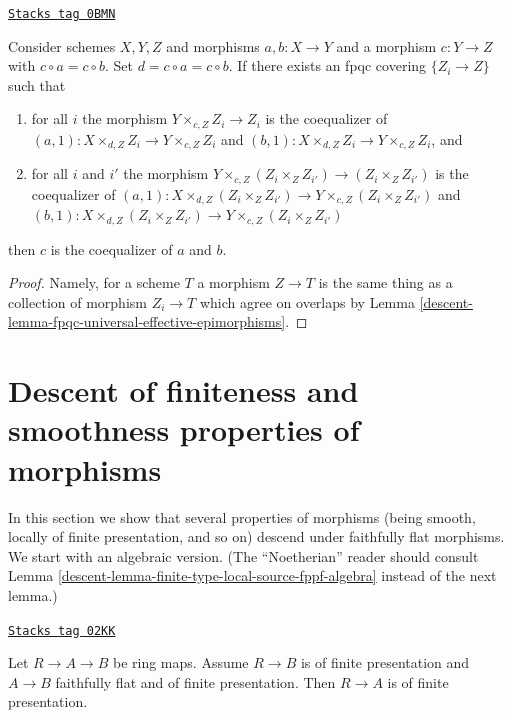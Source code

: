 \begin{lemma}
\label{descent-lemma-coequalizer-fpqc-local}
\href{https://stacks.math.columbia.edu/tag/0BMN}{\texttt{Stacks tag 0BMN}}

Consider schemes $X, Y, Z$ and morphisms $a, b : X \to Y$ and
a morphism $c : Y \to Z$ with $c \circ a = c \circ b$. Set
$d = c \circ a = c \circ b$. If there exists an
fpqc covering $\{Z_i \to Z\}$ such that
\begin{enumerate}
\item for all $i$ the morphism $Y \times_{c, Z} Z_i \to Z_i$
is the coequalizer of $(a, 1) : X \times_{d, Z} Z_i \to Y \times_{c, Z} Z_i$
and $(b, 1) : X \times_{d, Z} Z_i \to Y \times_{c, Z} Z_i$, and
\item for all $i$ and $i'$ the morphism
$Y \times_{c, Z} (Z_i \times_Z Z_{i'}) \to (Z_i \times_Z Z_{i'})$
is the coequalizer of
$(a, 1) : X \times_{d, Z} (Z_i \times_Z Z_{i'}) \to
Y \times_{c, Z} (Z_i \times_Z Z_{i'})$ and
$(b, 1) : X \times_{d, Z} (Z_i \times_Z Z_{i'}) \to
Y \times_{c, Z} (Z_i \times_Z Z_{i'})$
\end{enumerate}
then $c$ is the coequalizer of $a$ and $b$.
\end{lemma}

\begin{proof}

Namely, for a scheme $T$ a morphism $Z \to T$ is the same thing as
a collection of morphism $Z_i \to T$ which agree on overlaps by
Lemma \ref{descent-lemma-fpqc-universal-effective-epimorphisms}.
\end{proof}

\section{Descent of finiteness and smoothness properties of morphisms}
\label{descent-section-descent-finiteness-morphisms}
In this section we show that several properties
of morphisms (being smooth, locally of finite presentation,
and so on) descend under faithfully flat morphisms. We start
with an algebraic version. (The ``Noetherian'' reader should
consult Lemma \ref{descent-lemma-finite-type-local-source-fppf-algebra}
instead of the next lemma.)

\begin{lemma}
\label{descent-lemma-flat-finitely-presented-permanence-algebra}
\href{https://stacks.math.columbia.edu/tag/02KK}{\texttt{Stacks tag 02KK}}

Let $R \to A \to B$ be ring maps.
Assume $R \to B$ is of finite presentation and
$A \to B$ faithfully flat and of finite presentation.
Then $R \to A$ is of finite presentation.
\end{lemma}

